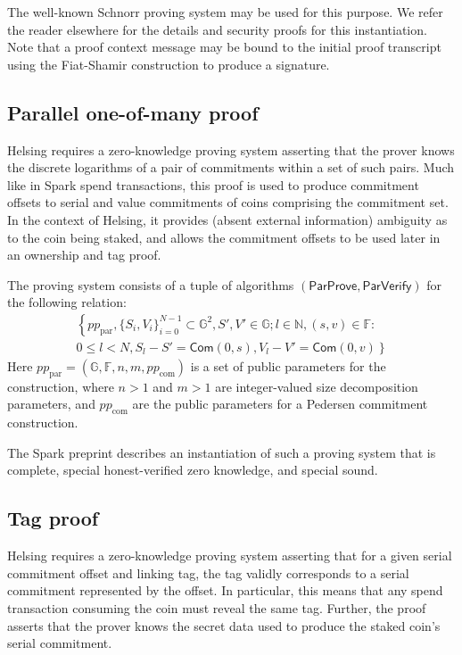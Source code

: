 \documentclass{article}
\newcommand{\G}{\mathbb{G}}
\newcommand{\F}{\mathbb{F}}
\newcommand{\func}[1]{\mathsf{#1}}
\newcommand{\com}{\func{Com}}
\theoremstyle{remark}
\begin{document}
The well-known Schnorr proving system may be used for this purpose.
We refer the reader elsewhere for the details and security proofs for this instantiation.
Note that a proof context message may be bound to the initial proof transcript using the Fiat-Shamir construction to produce a signature.


\subsection{Parallel one-of-many proof}

Helsing requires a zero-knowledge proving system asserting that the prover knows the discrete logarithms of a pair of commitments within a set of such pairs.
Much like in Spark spend transactions, this proof is used to produce commitment offsets to serial and value commitments of coins comprising the commitment set.
In the context of Helsing, it provides (absent external information) ambiguity as to the coin being staked, and allows the commitment offsets to be used later in an ownership and tag proof.

The proving system consists of a tuple of algorithms $(\func{ParProve},\func{ParVerify})$ for the following relation:
\begin{multline*}
\left\{ pp_{\text{par}}, \{S_i,V_i\}_{i=0}^{N-1} \subset \G^2, S',V' \in \G ; l \in \mathbb{N}, (s,v) \in \F : \right. \\
\left. 0 \leq l < N, S_l - S' = \com(0,s), V_l - V' = \com(0,v) \right\}
\end{multline*}
Here $pp_{\text{par}} = (\G, \F, n, m, pp_{\text{com}})$ is a set of public parameters for the construction, where $n > 1$ and $m > 1$ are integer-valued size decomposition parameters, and $pp_{\text{com}}$ are the public parameters for a Pedersen commitment construction.

The Spark preprint describes an instantiation of such a proving system that is complete, special honest-verified zero knowledge, and special sound.


\subsection{Tag proof}

Helsing requires a zero-knowledge proving system asserting that for a given serial commitment offset and linking tag, the tag validly corresponds to a serial commitment represented by the offset.
In particular, this means that any spend transaction consuming the coin must reveal the same tag.
Further, the proof asserts that the prover knows the secret data used to produce the staked coin's serial commitment.
\end{document}
